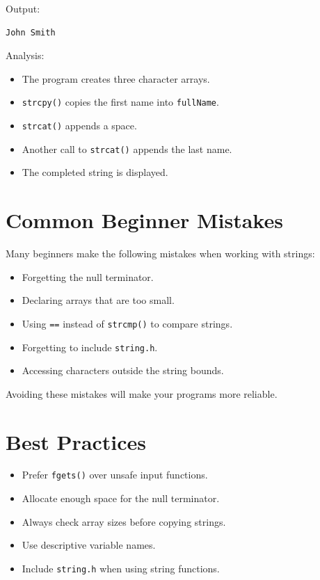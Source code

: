 \documentclass[12pt,openany]{book}
\begin{document}
Output:

\begin{lstlisting}
John Smith
\end{lstlisting}

Analysis:

\begin{itemize}
    \item The program creates three character arrays.
    \item \texttt{strcpy()} copies the first name into \texttt{fullName}.
    \item \texttt{strcat()} appends a space.
    \item Another call to \texttt{strcat()} appends the last name.
    \item The completed string is displayed.
\end{itemize}

\section{Common Beginner Mistakes}

Many beginners make the following mistakes when working with strings:

\begin{itemize}
    \item Forgetting the null terminator.
    \item Declaring arrays that are too small.
    \item Using \texttt{==} instead of \texttt{strcmp()} to compare strings.
    \item Forgetting to include \texttt{string.h}.
    \item Accessing characters outside the string bounds.
\end{itemize}

Avoiding these mistakes will make your programs more reliable.

\section{Best Practices}

\begin{itemize}
    \item Prefer \texttt{fgets()} over unsafe input functions.
    \item Allocate enough space for the null terminator.
    \item Always check array sizes before copying strings.
    \item Use descriptive variable names.
    \item Include \texttt{string.h} when using string functions.
\end{itemize}
\end{document}
